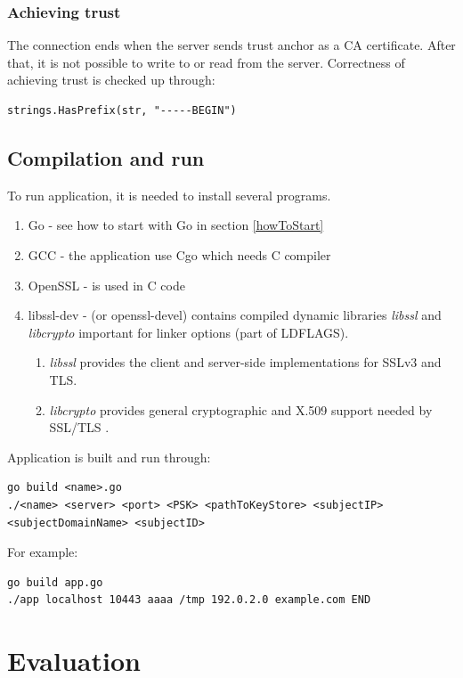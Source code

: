 \documentclass[
  digital, %
  notable,   %
  lof,     %
  lot,     %
]{fithesis3}
\begin{document}
\subsection{Achieving trust}
The connection ends when the server sends trust anchor as a CA certificate. After that, it is not 
possible to write to or read from the server. Correctness of achieving trust is checked up 
through:
\begin{lstlisting}
strings.HasPrefix(str, "-----BEGIN")
\end{lstlisting}

\section{Compilation and run}
To run application, it is needed to install several programs.
\begin{enumerate}
\item Go - see how to start with Go in section \ref{howToStart}
\item GCC - the application use Cgo which needs C compiler
\item OpenSSL - is used in C code
\item libssl-dev - (or openssl-devel) contains compiled dynamic libraries \textit{libssl} and \textit{libcrypto} important for linker options (part of LDFLAGS). 
\begin{enumerate}
  \item \textit{libssl} provides the client and server-side implementations for SSLv3 and TLS.
  \item \textit{libcrypto} provides general cryptographic and X.509 support needed by SSL/TLS \cite{opensslgit}.
\end{enumerate}
\end{enumerate}

Application is built and run through:
\begin{lstlisting}
go build <name>.go
./<name> <server> <port> <PSK> <pathToKeyStore> <subjectIP> <subjectDomainName> <subjectID>
\end{lstlisting}

For example:
\begin{lstlisting}
go build app.go
./app localhost 10443 aaaa /tmp 192.0.2.0 example.com END
\end{lstlisting}

\nocite{linux-man}
\nocite{foundation}

\chapter{Evaluation}
\end{document}
